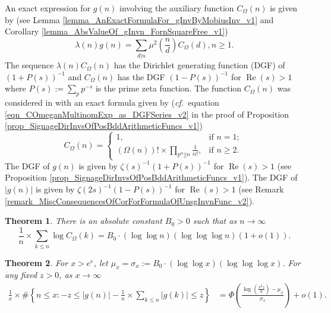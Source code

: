 \documentclass[11pt,reqno,a4letter]{article}
\newcommand{\hlocalref}[1]{\hyperref[#1]{\ref{#1}}}
\numberwithin{equation}{section}
\numberwithin{figure}{section}
\numberwithin{table}{section}
\newcommand{\cf}{\textit{cf.\ }}
\theoremstyle{plain}
\newtheorem{theorem}{Theorem}
\numberwithin{theorem}{section}
\theoremstyle{definition}
\renewcommand{\Re}{\operatorname{Re}}
\begin{document}
An exact expression for $g(n)$ involving the auxiliary function 
$C_{\Omega}(n)$ is given by 
(see Lemma \hlocalref{lemma_AnExactFormulaFor_gInvByMobiusInv_v1} and 
Corollary \hlocalref{lemma_AbsValueOf_gInvn_FornSquareFree_v1}) 
\begin{equation}
\label{eqn_gInvn_ExactDivisorSumFormula_WithSgnWeight_v1} 
\lambda(n) g(n) = \sum_{d|n} \mu^2\left(\frac{n}{d}\right) C_{\Omega}(d), n \geq 1. 
\end{equation}
The sequence $\lambda(n) C_{\Omega}(n)$ has the 
Dirichlet generating function (DGF) of $(1 + P(s))^{-1}$ and 
$C_{\Omega}(n)$ has the DGF $(1-P(s))^{-1}$ for $\Re(s) > 1$ 
where $P(s) := \sum_p p^{-s}$ is the prime zeta function. 
The function $C_{\Omega}(n)$ was considered in 
\cite{FROBERG-1968} with an exact formula given by 
(\cf equation \eqref{eqn_COmeganMultinomExp_as_DGFSeries_v2} in the 
proof of Proposition \hlocalref{prop_SignageDirInvsOfPosBddArithmeticFuncs_v1}) 
\begin{equation}
\label{eqn_proof_tag_hInvn_ExactNestedSumFormula_CombInterpetIdent_v3}
C_{\Omega}(n) = \begin{cases}
     1, & \text{if $n = 1$; } \\ 
     (\Omega(n))! \times \prod\limits_{p^{\alpha}||n} \frac{1}{\alpha!}, & \text{if $n \geq 2$. }
     \end{cases}
\end{equation} 
The DGF of $g(n)$ is given by $\zeta(s)^{-1} (1 + P(s))^{-1}$ for $\Re(s) > 1$ 
(see Proposition \hlocalref{prop_SignageDirInvsOfPosBddArithmeticFuncs_v1}). 
The DGF of $|g(n)|$ is given by $\zeta(2s)^{-1} (1 - P(s))^{-1}$ for $\Re(s) > 1$ 
(see Remark \hlocalref{remark_MiscConsequencesOfCorForFormulaOfUnsgInvnFunc_v2}). 

\begin{theorem} 
\label{lemma_HatCAstxSum_ExactFormulaWithError_v1} 
There is an absolute constant $B_0 > 0$ such that as $n \rightarrow \infty$ 
\[
\frac{1}{n} \times \sum_{k \leq n} \log C_{\Omega}(k) = 
     B_0 \cdot (\log\log n)(\log\log\log n) \left(1 + o(1)\right). 
\] 
\end{theorem} 

\begin{theorem}
\label{cor_CLT_VII}
For $x > e^e$, let $\mu_x = \sigma_x := B_0 \cdot (\log\log x)(\log\log\log x)$. 
For any fixed $z > 0$, as $x \rightarrow \infty$ 
\begin{align*} 
\frac{1}{x} \times \#\left\{n \leq x: -z \leq |g(n)| - 
        \frac{1}{n} \times \sum_{k \leq n} |g(k)| \leq z\right\} & = 
        \Phi\left(\frac{\log\left(\frac{\pi^2 z}{6}\right) - \mu_x}{\sigma_x}\right) + o(1).
\end{align*} 
\end{theorem}
\end{document}
